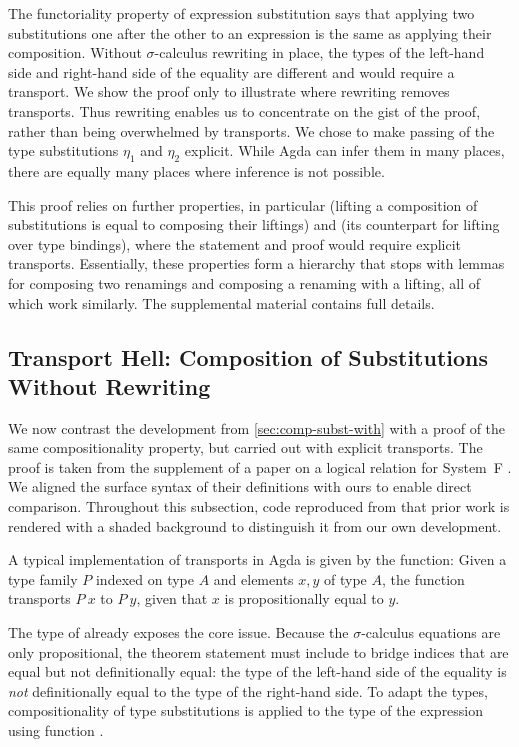 \documentclass[manuscript,screen,review,anonymous,acmsmall]{acmart}
\begin{document}
The functoriality property of expression substitution says that
applying two substitutions one after the other to an expression is the
same as applying their composition. Without $\sigma$-calculus rewriting in place, the types
of the left-hand side and 
right-hand side of the equality are different and would require a transport.
\SFExprSubCompositionalityType
We show the proof only to illustrate where rewriting removes
transports. Thus rewriting enables us to
concentrate on the gist of the proof, rather than being overwhelmed by
transports. We chose to make passing
of the type substitutions $\eta_1$ and $\eta_2$ explicit. While Agda
can infer them in many places,
there are equally many places where inference is not possible.
\SFExprSubCompositionalityBody

This proof relies on further properties, in particular
 (lifting a composition of substitutions
is equal to composing their liftings) and
 (its counterpart for lifting
over type bindings), where the statement and proof would require
explicit transports. Essentially, these properties form a hierarchy
that stops with lemmas for composing two renamings and composing a
renaming with a lifting, all of which work similarly. The supplemental
material contains full details.

\subsection{Transport Hell: Composition of Substitutions Without Rewriting}
\label{sec:comparison-transfer-hell}
We now contrast the development from \cref{sec:comp-subst-with} with
a proof of the same compositionality property, but carried out with explicit transports.
The proof is taken from the supplement of a paper on a
logical relation for System~F \cite{10.1145/3678000.3678201}. We aligned the surface syntax
of their definitions with ours to enable direct comparison.
Throughout this subsection, code reproduced from that prior work is rendered
with a shaded background to distinguish it from our own development.

A typical implementation of transports in Agda is given by the  function:
\SubstExamplesDef
Given a type family $P$ indexed on type $A$ and elements $x, y$ of type $A$, the function 
transports $P~x$ to $P~y$, given that $x$ is 
propositionally equal to $y$.

The type of  already exposes the
core issue. 
Because the $\sigma$-calculus equations are only
propositional, the theorem statement must include
 to bridge indices that are equal
but not definitionally equal: the type of the left-hand side of the equality is \emph{not}
definitionally equal to the type of the right-hand side. 
To adapt the types,
compositionality of type substitutions is applied to the type of the
expression using function .
\begin{transferhellbox}
\ExportCompositionalityHom
\end{transferhellbox}
\end{document}
